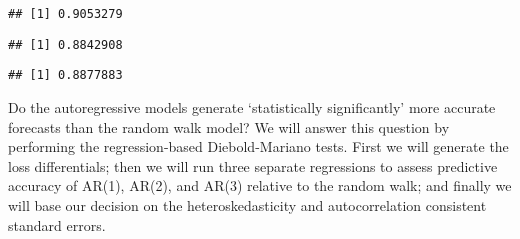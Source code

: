 \documentclass[
  oneside]{book}
\newenvironment{Shaded}{\begin{snugshade}}{\end{snugshade}}
\newcommand{\AttributeTok}[1]{\textcolor[rgb]{0.77,0.63,0.00}{#1}}
\newcommand{\DecValTok}[1]{\textcolor[rgb]{0.00,0.00,0.81}{#1}}
\newcommand{\FunctionTok}[1]{\textcolor[rgb]{0.00,0.00,0.00}{#1}}
\newcommand{\NormalTok}[1]{#1}
\newcommand{\SpecialCharTok}[1]{\textcolor[rgb]{0.00,0.00,0.00}{#1}}
\begin{document}
\begin{Shaded}
\end{Shaded}

\begin{verbatim}
## [1] 0.9053279
\end{verbatim}

\begin{Shaded}
\end{Shaded}

\begin{verbatim}
## [1] 0.8842908
\end{verbatim}

\begin{Shaded}
\end{Shaded}

\begin{verbatim}
## [1] 0.8877883
\end{verbatim}

Do the autoregressive models generate `statistically significantly' more accurate forecasts than the random walk model? We will answer this question by performing the regression-based Diebold-Mariano tests. First we will generate the loss differentials; then we will run three separate regressions to assess predictive accuracy of AR(1), AR(2), and AR(3) relative to the random walk; and finally we will base our decision on the heteroskedasticity and autocorrelation consistent standard errors.
\end{document}
